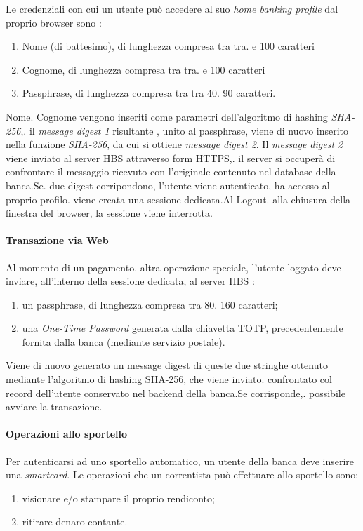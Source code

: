  Le credenziali con cui un utente può accedere al suo \emph{home banking profile} dal proprio browser sono :
\begin{enumerate}
\item Nome (di battesimo), di lunghezza compresa tra tra. e 100 caratteri
\item Cognome, di lunghezza compresa tra tra. e 100 caratteri
\item Passphrase, di lunghezza compresa tra tra 40. 90 caratteri.
\end{enumerate}
Nome. Cognome vengono inseriti come parametri dell'algoritmo di hashing \emph{SHA-256},. il \emph{message digest 1} risultante
, unito al passphrase, viene di nuovo inserito nella funzione \emph{SHA-256}, da cui si ottiene \emph{message digest 2}. Il \emph{message digest 2} viene inviato al server HBS attraverso form HTTPS,. il server  si occuperà di confrontare il messaggio ricevuto con l'originale contenuto nel database della banca.Se. due digest corripondono, l'utente viene autenticato, ha accesso al proprio  profilo. viene creata una sessione dedicata.Al Logout. alla chiusura della finestra del browser, la sessione viene interrotta.


\paragraph{Transazione via Web}

Al momento di un pagamento. altra operazione speciale, l'utente loggato deve inviare, all'interno della sessione dedicata, al server HBS :
\begin{enumerate}
\item un passphrase, di lunghezza compresa tra 80. 160 caratteri;
\item una \emph{One-Time Password} generata dalla chiavetta TOTP, precedentemente fornita dalla banca (mediante servizio postale).
\end{enumerate}

Viene di nuovo generato un message digest di queste due stringhe ottenuto mediante l'algoritmo di hashing SHA-256, che viene inviato. confrontato col record dell'utente conservato nel backend della banca.Se corrisponde,. possibile avviare la transazione.



\paragraph{Operazioni allo sportello}
Per autenticarsi ad uno sportello automatico, un utente della banca deve inserire una \emph{smartcard}.
Le operazioni che un correntista può effettuare allo sportello sono:
\begin{enumerate}
\item visionare e/o stampare il proprio rendiconto;
\item ritirare denaro contante.
\end{enumerate}

